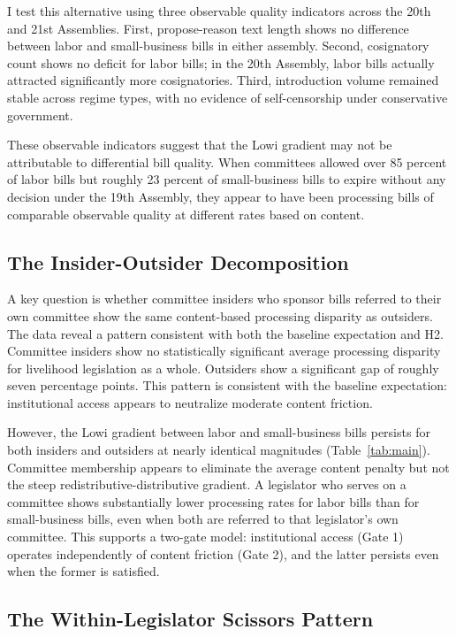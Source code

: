 \documentclass[11pt]{article}
\begin{document}
I test this alternative using three observable quality indicators across the 20th and 21st Assemblies. First, propose-reason text length shows no difference between labor and small-business bills in either assembly. Second, cosignatory count shows no deficit for labor bills; in the 20th Assembly, labor bills actually attracted significantly more cosignatories. Third, introduction volume remained stable across regime types, with no evidence of self-censorship under conservative government.

These observable indicators suggest that the Lowi gradient may not be attributable to differential bill quality. When committees allowed over 85 percent of labor bills but roughly 23 percent of small-business bills to expire without any decision under the 19th Assembly, they appear to have been processing bills of comparable observable quality at different rates based on content.

\subsection{The Insider-Outsider Decomposition}

A key question is whether committee insiders who sponsor bills referred to their own committee show the same content-based processing disparity as outsiders. The data reveal a pattern consistent with both the baseline expectation and H2. Committee insiders show no statistically significant average processing disparity for livelihood legislation as a whole. Outsiders show a significant gap of roughly seven percentage points. This pattern is consistent with the baseline expectation: institutional access appears to neutralize moderate content friction.

However, the Lowi gradient between labor and small-business bills persists for both insiders and outsiders at nearly identical magnitudes (Table~\ref{tab:main}). Committee membership appears to eliminate the average content penalty but not the steep redistributive-distributive gradient. A legislator who serves on a committee shows substantially lower processing rates for labor bills than for small-business bills, even when both are referred to that legislator's own committee. This supports a two-gate model: institutional access (Gate 1) operates independently of content friction (Gate 2), and the latter persists even when the former is satisfied.

\subsection{The Within-Legislator Scissors Pattern}
\end{document}
